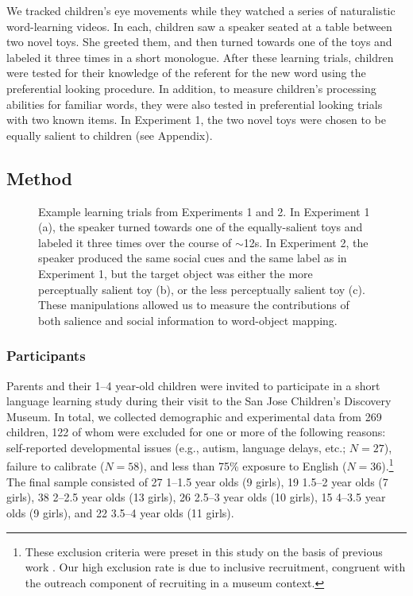 \documentclass[man,floatsintext]{apa6}
\begin{document}
We tracked children's eye movements while they watched a series of naturalistic word-learning videos. In each, children saw a speaker seated at a table between two novel toys. She greeted them, and then turned towards one of the toys and labeled it three times in a short monologue. After these learning trials, children were tested for their knowledge of the referent for the new word using the preferential looking procedure. In addition, to measure children's processing abilities for familiar words, they were also tested in preferential looking trials with two known items. In Experiment 1, the two novel toys were chosen to be equally salient to children (see Appendix).

\subsection{Method}

\begin{figure}[tb]
	\caption{\label{fig:design} Example learning trials from Experiments 1 and 2. In Experiment 1 (a), the speaker turned towards one of the equally-salient toys and labeled it three times over the course of $\sim$12s. In Experiment 2, the speaker produced the same social cues and the same label as in Experiment 1, but the target object was either the more perceptually salient toy (b), or the less perceptually salient toy (c). These manipulations allowed us to measure the contributions of both salience and social information to word-object mapping.}
\end{figure}

\subsubsection{Participants}

Parents and their 1--4 year-old children were invited to participate in a short language learning study during their visit to the San Jose Children's Discovery Museum. In total, we collected demographic and experimental data from 269 children, 122 of whom were excluded for one or more of the following reasons: self-reported developmental issues (e.g., autism, language delays, etc.; $N= 27$), failure to calibrate ($N=58$), and less than 75\% exposure to English ($N=36$).\footnote{These exclusion criteria were preset in this study on the basis of previous work \cite{Yurovsky2013c}. Our high exclusion rate is due to inclusive recruitment, congruent with the outreach component of recruiting in a museum context.} The final sample consisted of 27 1--1.5 year olds (9 girls), 19 1.5--2 year olds (7 girls), 38 2--2.5 year olds (13 girls), 26 2.5--3 year olds (10 girls), 15 4--3.5 year olds (9 girls), and 22 3.5--4 year olds (11 girls).
\end{document}
